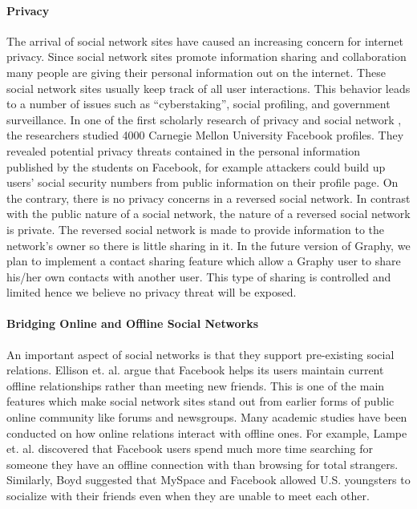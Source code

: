 \paragraph{Privacy}
The arrival of social network sites have caused an increasing concern for internet privacy. Since social network sites promote information sharing and collaboration many people are giving their personal information out on the internet. These social network sites usually keep track of all user interactions. This behavior leads to a number of issues such as ``cyberstaking'', social profiling, and government surveillance. In one of the first scholarly research of privacy and social network \cite{gross2005information}, the researchers studied 4000 Carnegie Mellon University Facebook profiles. They revealed potential privacy threats contained in the personal information published by the students on Facebook, for example attackers could build up users' social security numbers from public information on their profile page. On the contrary, there is no privacy concerns in a reversed social network. In contrast with the public nature of a social network, the nature of a reversed social network is private. The reversed social network is made to provide information to the network's owner so there is little sharing in it. In the future version of Graphy, we plan to implement a contact sharing feature which allow a Graphy user to share his/her own contacts with another user. This type of sharing is controlled and limited hence we believe no privacy threat will be exposed. 

\paragraph{Bridging Online and Offline Social Networks}
An important aspect of social networks is that they support pre-existing social relations. Ellison et. al. \cite{ellison2007benefits} argue that Facebook helps its users maintain current offline relationships rather than meeting new friends. This is one of the main features which make social network sites stand out from earlier forms of public online community like forums and newsgroups. Many academic studies have been conducted on how online relations interact with offline ones. For example, Lampe et. al. \cite{lampe2006face} discovered that Facebook users spend much more time searching for someone they have an offline connection with than browsing for total strangers. Similarly, Boyd \cite{boyd2007youth} suggested that MySpace and Facebook allowed U.S. youngsters to socialize with their friends even when they are unable to meet each other. 

